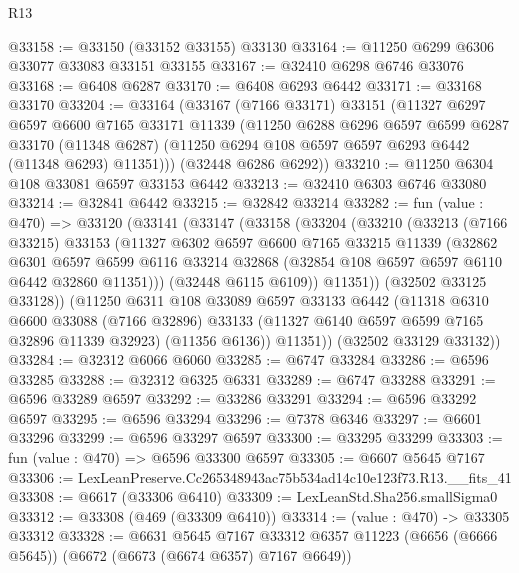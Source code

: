 \begin{lexlean}{R13}
\begin{coremodule}
@33158 := @33150 (@33152 @33155) @33130
@33164 := @11250 @6299 @6306 @33077 @33083 @33151 @33155
@33167 := @32410 @6298 @6746 @33076
@33168 := @6408 @6287
@33170 := @6408 @6293 @6442
@33171 := @33168 @33170
@33204 := @33164
    (@33167
      (@7166 @33171)
      @33151
      (@11327
        @6297
        @6597
        @6600
        @7165
        @33171
        @11339
        (@11250
          @6288
          @6296
          @6597
          @6599
          @6287
          @33170
          (@11348 @6287)
          (@11250 @6294 @108 @6597 @6597 @6293 @6442 (@11348 @6293) @11351)))
      (@32448 @6286 @6292))
@33210 := @11250 @6304 @108 @33081 @6597 @33153 @6442
@33213 := @32410 @6303 @6746 @33080
@33214 := @32841 @6442
@33215 := @32842 @33214
@33282 := fun (value : @470) =>
  @33120
    (@33141
      (@33147
        (@33158
          (@33204
            (@33210
              (@33213
                (@7166 @33215)
                @33153
                (@11327
                  @6302
                  @6597
                  @6600
                  @7165
                  @33215
                  @11339
                  (@32862
                    @6301
                    @6597
                    @6599
                    @6116
                    @33214
                    @32868
                    (@32854 @108 @6597 @6597 @6110 @6442 @32860 @11351)))
                (@32448 @6115 @6109))
              @11351))
          (@32502 @33125 @33128))
        (@11250
          @6311
          @108
          @33089
          @6597
          @33133
          @6442
          (@11318
            @6310
            @6600
            @33088
            (@7166 @32896)
            @33133
            (@11327 @6140 @6597 @6599 @7165 @32896 @11339 @32923)
            (@11356 @6136))
          @11351))
      (@32502 @33129 @33132))
@33284 := @32312 @6066 @6060
@33285 := @6747 @33284
@33286 := @6596 @33285
@33288 := @32312 @6325 @6331
@33289 := @6747 @33288
@33291 := @6596 @33289 @6597
@33292 := @33286 @33291
@33294 := @6596 @33292 @6597
@33295 := @6596 @33294
@33296 := @7378 @6346
@33297 := @6601 @33296
@33299 := @6596 @33297 @6597
@33300 := @33295 @33299
@33303 := fun (value : @470) => @6596 @33300 @6597
@33305 := @6607 @5645 @7167
@33306 := LexLeanPreserve.Cc265348943ac75b534ad14c10e123f73.R13.__fits_41
@33308 := @6617 (@33306 @6410)
@33309 := LexLeanStd.Sha256.smallSigma0
@33312 := @33308 (@469 (@33309 @6410))
@33314 := (value : @470) -> @33305 @33312
@33328 := @6631
    @5645
    @7167
    @33312
    @6357
    @11223
    (@6656 (@6666 @5645))
    (@6672 (@6673 (@6674 @6357) @7167 @6649))

\end{coremodule}
\end{lexlean}
